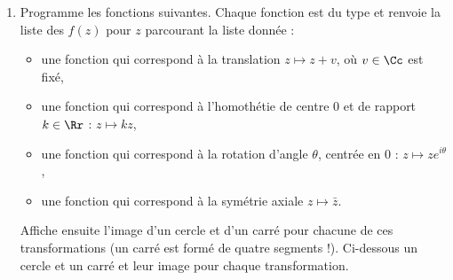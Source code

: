 \documentclass[11pt,class=report,crop=false]{standalone}
\begin{document}
\begin{activite}


\begin{enumerate}
  \item Programme les fonctions suivantes. Chaque fonction est du type
   et renvoie la liste des $f(z)$ pour $z$ parcourant la liste donnée :
  \begin{itemize}
    \item une fonction  qui correspond à la translation $z \mapsto z + v$, où $v\in\Cc$ est fixé,
    
    \item une fonction  qui correspond à l'homothétie de centre $0$ et de rapport $k\in\Rr$ : $z \mapsto kz$,
    
    \item une fonction  qui correspond à la rotation d'angle $\theta$, centrée en $0$ : $z \mapsto ze^{i\theta}$,
    
    \item une fonction  qui correspond à la symétrie axiale $z \mapsto \bar z$.
    
  \end{itemize}
  
Affiche ensuite l'image d'un cercle et d'un carré pour chacune de ces transformations (un carré est formé de quatre segments !). Ci-dessous un cercle et un carré et leur image pour chaque transformation.
   

\end{enumerate}
\end{activite}
\end{document}
